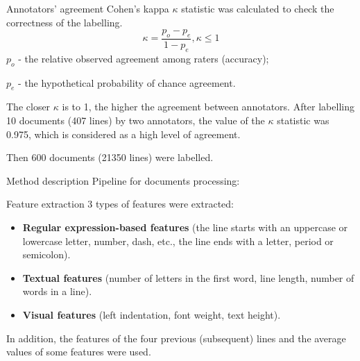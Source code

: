 \documentclass{beamer}
\begin{document}
\begin{frame}{Annotators' agreement}
    Cohen's kappa $\kappa$ statistic was calculated to check the correctness of the labelling.
    $$ \kappa = \frac{p_o-p_e}{1-p_e}, \kappa \leq 1 $$
    $p_o$ - the relative observed agreement among raters (accuracy);
    
    $p_e$ - the hypothetical probability of chance agreement.
    
    The closer $\kappa$ is to 1, the higher the agreement between annotators. After labelling 10 documents (407 lines) by two annotators, the value of the $\kappa$ statistic was 0.975, which is considered as a high level of agreement. 
    
    Then  600 documents (21350 lines) were labelled.
\end{frame}

\begin{frame}{Method description}
    Pipeline for documents processing:
\end{frame}

\begin{frame}{Feature extraction}
    3 types of features were extracted:
    \begin{itemize}
        \item \textbf{Regular expression-based features} (the line starts with an uppercase or lowercase letter, number, dash, etc., the line ends with a letter, period or semicolon).
        \item \textbf{Textual features} (number of letters in the first word, line length, number of words in a line).
        \item \textbf{Visual features} (left indentation, font weight, text height).
    \end{itemize}
    In addition, the features of the four previous (subsequent) lines and the average values of some features were used.
\end{frame}
\end{document}
